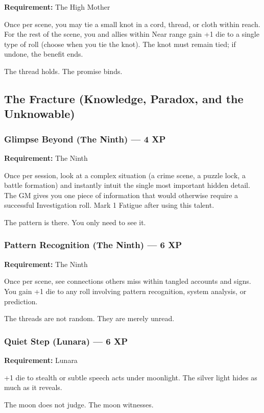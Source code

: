 \textbf{Requirement:} The High Mother

Once per scene, you may tie a small knot in a cord, thread, or cloth within reach. For the rest of the scene, you and allies within Near range gain +1 die to a single type of roll (choose when you tie the knot). The knot must remain tied; if undone, the benefit ends.

The thread holds. The promise binds.

\subsection{The Fracture (Knowledge, Paradox, and the Unknowable)}

\subsubsection{Glimpse Beyond (The Ninth) — 4 XP}

\textbf{Requirement:} The Ninth

Once per session, look at a complex situation (a crime scene, a puzzle lock, a battle formation) and instantly intuit the single most important hidden detail. The GM gives you one piece of information that would otherwise require a successful Investigation roll. Mark 1 Fatigue after using this talent.

The pattern is there. You only need to see it.

\subsubsection{Pattern Recognition (The Ninth) — 6 XP}

\textbf{Requirement:} The Ninth

Once per scene, see connections others miss within tangled accounts and signs. You gain +1 die to any roll involving pattern recognition, system analysis, or prediction.

The threads are not random. They are merely unread.

\subsubsection{Quiet Step (Lunara) — 6 XP}

\textbf{Requirement:} Lunara

+1 die to stealth or subtle speech acts under moonlight. The silver light hides as much as it reveals.

The moon does not judge. The moon witnesses.

